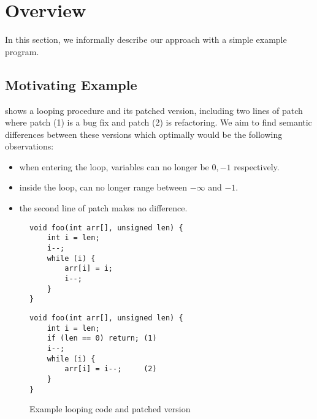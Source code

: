 \section{Overview} 

In this section, we informally describe our approach with a simple example program.

\subsection{Motivating Example}

 shows a looping procedure and its patched version, including two lines of patch where patch (1) is a bug fix and patch (2) is refactoring. We aim to find semantic differences between these versions which optimally would be the following observations:
\begin{itemize}
\item when entering the loop, variables  can no longer be $0,-1$ respectively.
\item inside the loop,  can no longer range between $-\infty$ and $-1$.
\item the second line of patch makes no difference.
\end{itemize}

\begin{figure}[ht]
\centering
\begin{lstlisting}
void foo(int arr[], unsigned len) {
    int i = len;
    i--;
    while (i) {
        arr[i] = i;
        i--;
    }
}
\end{lstlisting}
\hspace{0.5cm}
\centering
\begin{lstlisting}
void foo(int arr[], unsigned len) {
    int i = len;
    if (len == 0) return; (1)
    i--;
    while (i) {
        arr[i] = i--;     (2)
    }
}
\end{lstlisting}
\caption{Example looping code and patched version}
\end{figure}

